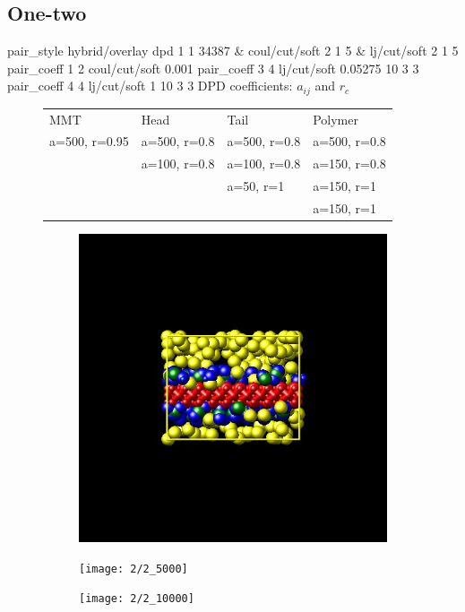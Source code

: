 \documentclass[a4paper]{article}
\begin{document}
\subsection*{One-two}
pair\_style hybrid/overlay dpd 1 1 34387 \& coul/cut/soft 2 1 5 \& 
lj/cut/soft 2 1 5\newline
pair\_coeff 1 2 coul/cut/soft 0.001\newline
pair\_coeff 3 4 lj/cut/soft 0.05275 10 3 3\newline
pair\_coeff 4 4 lj/cut/soft 1       10 3 3\newline
DPD coefficients: $a_{ij}$ and $r_c$
\begin{figure}[H]\begin{tabular}{llll}
MMT           & Head         & Tail         & Polymer      \\
a=500, r=0.95 & a=500, r=0.8 & a=500, r=0.8 & a=500, r=0.8 \\
              & a=100, r=0.8 & a=100, r=0.8 & a=150, r=0.8 \\
              &              & a=50,  r=1   & a=150, r=1   \\
              &              &              & a=150, r=1   \\
\end{tabular}\end{figure}

\begin{figure}[H]
\begin{subfigure}{0.3\textwidth}
  \centering
  \includegraphics[width=\linewidth,keepaspectratio]{start}
  \caption{}
\end{subfigure}
\begin{subfigure}{0.3\textwidth}
  \centering
  \texttt{[image: 2/2\_5000]}
  \caption{}
\end{subfigure}
\begin{subfigure}{0.3\textwidth}
  \centering
  \texttt{[image: 2/2\_10000]}
  \caption{}
\end{subfigure}
\caption{}
\label{fig_1}
\end{figure}
\end{document}
